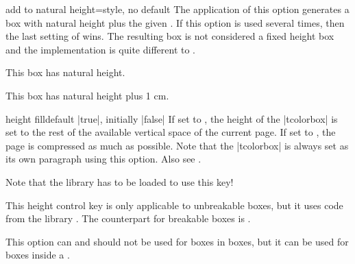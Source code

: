 \begin{docTcbKey}[][doc new=2016-02-16]{add to natural height}{=}{style, no default}
  The application of this option generates a box with natural height plus
  the given . If this option is used several times, then the
  last setting of  wins. The resulting box is not considered
  a fixed height box and the implementation is quite different to
  .
\begin{dispExample}

\begin{tcolorbox}
  This box has natural height.
\end{tcolorbox}
\begin{tcolorbox}[add to natural height=1cm]
  This box has natural height plus 1 cm.
\end{tcolorbox}
\end{dispExample}
\end{docTcbKey}


\clearpage
\begin{docTcbKey}[][doc new and updated={2014-09-22}{2016-02-17}]{height fill}{}{default |true|, initially |false|}
If set to , the height of the |tcolorbox| is set to the rest of the
available vertical space of the current page.
If set to , the page is compressed as much as possible.
Note that the |tcolorbox|
is always set as its own paragraph using this option.
Also see .
\begin{marker}
Note that the library  has to be loaded to use this key!
\end{marker}
This height control key is only applicable to unbreakable boxes, but it
uses code from the library .
The counterpart for breakable boxes is .

This option can and should not be used for boxes in boxes, but it can be
used for boxes inside a .

\begin{dispListing}
\begin{tcolorbox}[height fill,
  colback=red!5!white,colframe=red!75!black,fonttitle=\bfseries,
  title=Box which fills the rest of the page]
\lipsum[1]
\end{tcolorbox}
\end{dispListing}
\end{docTcbKey}
{\tcbusetemp}

